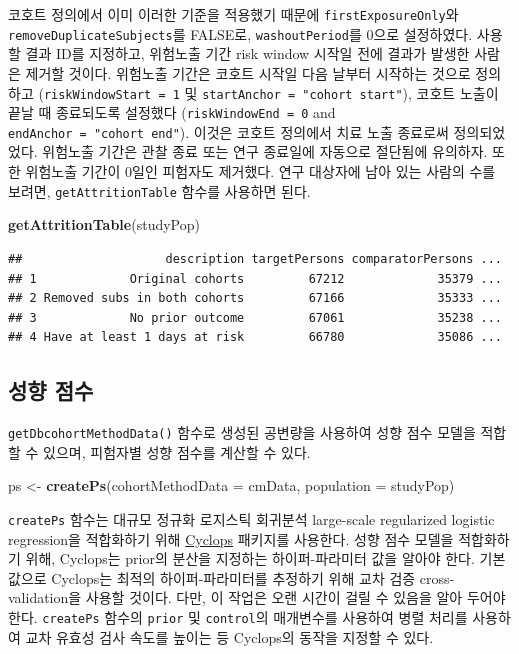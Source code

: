 \documentclass[10.5pt]{book}
\newenvironment{Shaded}{\begin{snugshade}}{\end{snugshade}}
\newcommand{\KeywordTok}[1]{\textcolor[rgb]{0.13,0.29,0.53}{\textbf{#1}}}
\newcommand{\DataTypeTok}[1]{\textcolor[rgb]{0.13,0.29,0.53}{#1}}
\newcommand{\StringTok}[1]{\textcolor[rgb]{0.31,0.60,0.02}{#1}}
\newcommand{\NormalTok}[1]{#1}
\theoremstyle{definition}
\theoremstyle{definition}
\theoremstyle{definition}
\theoremstyle{remark}
\begin{document}
코호트 정의에서 이미 이러한 기준을 적용했기 때문에
\texttt{firstExposureOnly}와 \texttt{removeDuplicateSubjects}를 FALSE로,
\texttt{washoutPeriod}를 0으로 설정하였다. 사용할 결과 ID를 지정하고,
위험노출 기간 risk window 시작일 전에 결과가 발생한 사람은 제거할
것이다. 위험노출 기간은 코호트 시작일 다음 날부터 시작하는 것으로
정의하고 (\texttt{riskWindowStart\ =\ 1} 및
\texttt{startAnchor\ =\ "cohort\ start"}), 코호트 노출이 끝날 때
종료되도록 설정했다 (\texttt{riskWindowEnd\ =\ 0} and
\texttt{endAnchor\ =\ "cohort\ end"}). 이것은 코호트 정의에서 치료 노출
종료로써 정의되었었다. 위험노출 기간은 관찰 종료 또는 연구 종료일에
자동으로 절단됨에 유의하자. 또한 위험노출 기간이 0일인 피험자도
제거했다. 연구 대상자에 남아 있는 사람의 수를 보려면,
\texttt{getAttritionTable} 함수를 사용하면 된다.

\begin{Shaded}
\begin{Highlighting}[]
\KeywordTok{getAttritionTable}\NormalTok{(studyPop)}
\end{Highlighting}
\end{Shaded}

\begin{verbatim}
##                    description targetPersons comparatorPersons ...
## 1             Original cohorts         67212             35379 ...
## 2 Removed subs in both cohorts         67166             35333 ...
## 3             No prior outcome         67061             35238 ...
## 4 Have at least 1 days at risk         66780             35086 ...
\end{verbatim}

\subsection{성향 점수}\label{--1}

\texttt{getDbcohortMethodData()} 함수로 생성된 공변량을 사용하여 성향
점수 모델을 적합할 수 있으며, 피험자별 성향 점수를 계산할 수 있다.

\begin{Shaded}
\begin{Highlighting}[]
\NormalTok{ps <-}\StringTok{ }\KeywordTok{createPs}\NormalTok{(}\DataTypeTok{cohortMethodData =}\NormalTok{ cmData, }\DataTypeTok{population =}\NormalTok{ studyPop)}
\end{Highlighting}
\end{Shaded}

\texttt{createPs} 함수는 대규모 정규화 로지스틱 회귀분석 large-scale
regularized logistic regression을 적합화하기 위해
\href{https://ohdsi.github.io/Cyclops/}{Cyclops} 패키지를 사용한다. 성향
점수 모델을 적합화하기 위해, Cyclops는 prior의 분산을 지정하는
하이퍼-파라미터 값을 알아야 한다. 기본값으로 Cyclops는 최적의
하이퍼-파라미터를 추정하기 위해 교차 검증 cross-validation을 사용할
것이다. 다만, 이 작업은 오랜 시간이 걸릴 수 있음을 알아 두어야 한다.
\texttt{createPs} 함수의 \texttt{prior} 및 \texttt{control}의 매개변수를
사용하여 병렬 처리를 사용하여 교차 유효성 검사 속도를 높이는 등
Cyclops의 동작을 지정할 수 있다.
\end{document}
